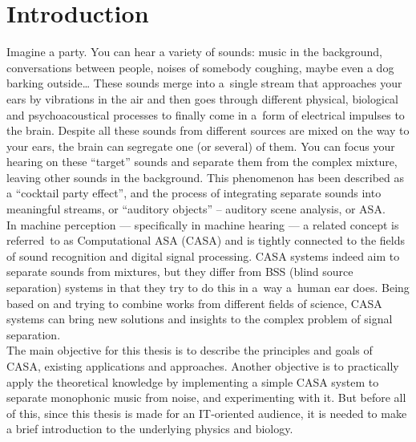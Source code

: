 \chapter{Introduction}\label{chapter:introduction}

Imagine a party. You can hear a variety of sounds: music in the background, conversations be\-tween people, noises of somebody coughing, maybe even a dog barking outside\dots{} These sounds merge into a~single stream that approaches your ears by vibrations in the air and then goes through different physical, biological and psychoacoustical processes to finally come in a~form of electrical impulses to the brain. Despite all these sounds from different sources are mixed on the way to your ears, the brain can segregate one (or several) of them. You can focus your hearing on these “target” sounds and separate them from the complex mixture, leaving other sounds in the background. This phenomenon has been described as a “cocktail party effect”, and the process of integrating separate sounds into meaningful streams, or “auditory objects” -- auditory scene analysis, or ASA.\\

In machine perception --- specifically in machine hearing --- a related concept is referred~to as Computational ASA (CASA) and is tightly connected to the fields of sound recognition and digital signal processing. CASA systems indeed aim to separate sounds from mixtures, but they differ from BSS (blind source separation) systems in that they try to do this in a~way a~human ear does. Being based on and trying to combine works from different fields of science, CASA systems can bring new solutions and insights to the complex problem of signal separation.\\

The main objective for this thesis is to describe the principles and goals of CASA, existing applications and approaches. Another objective is to practically apply the theoretical knowledge by implementing a simple CASA system to separate monophonic music from noise, and experimenting with it. But before all of this, since this thesis is made for an IT-oriented audience, it is needed to make a brief introduction to the underlying physics and biology.\\

